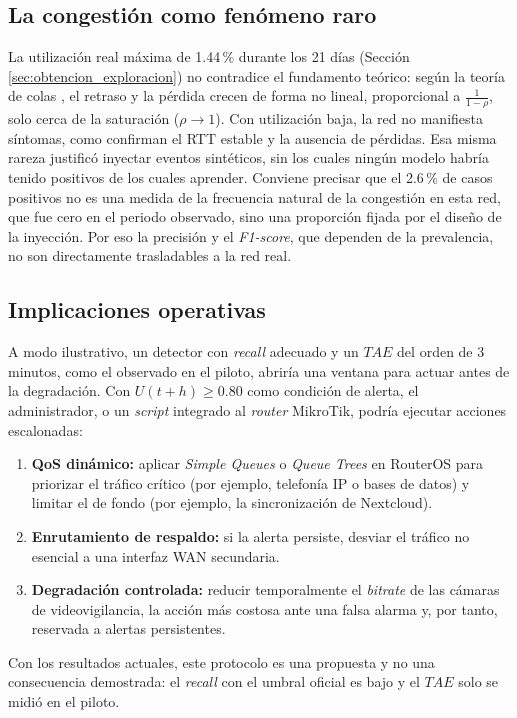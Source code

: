 \documentclass[12pt]{report}
\begin{document}
\subsection*{La congestión como fenómeno raro}

La utilización real máxima de 1.44\,\% durante los 21 días (Sección \ref{sec:obtencion_exploracion}) no contradice el fundamento teórico: según la teoría de colas \cite{kleinrock1976}, el retraso y la pérdida crecen de forma no lineal, proporcional a $\frac{1}{1-\rho}$, solo cerca de la saturación ($\rho \to 1$). Con utilización baja, la red no manifiesta síntomas, como confirman el RTT estable y la ausencia de pérdidas. Esa misma rareza justificó inyectar eventos sintéticos, sin los cuales ningún modelo habría tenido positivos de los cuales aprender. Conviene precisar que el 2.6\,\% de casos positivos no es una medida de la frecuencia natural de la congestión en esta red, que fue cero en el periodo observado, sino una proporción fijada por el diseño de la inyección. Por eso la precisión y el \textit{F1-score}, que dependen de la prevalencia, no son directamente trasladables a la red real.

\subsection*{Implicaciones operativas}

A modo ilustrativo, un detector con \textit{recall} adecuado y un $TAE$ del orden de 3 minutos, como el observado en el piloto, abriría una ventana para actuar antes de la degradación. Con $U(t+h) \geq 0.80$ como condición de alerta, el administrador, o un \textit{script} integrado al \textit{router} MikroTik, podría ejecutar acciones escalonadas:
\begin{enumerate}
    \item \textbf{QoS dinámico:} aplicar \textit{Simple Queues} o \textit{Queue Trees} en RouterOS para priorizar el tráfico crítico (por ejemplo, telefonía IP o bases de datos) y limitar el de fondo (por ejemplo, la sincronización de Nextcloud).
    \item \textbf{Enrutamiento de respaldo:} si la alerta persiste, desviar el tráfico no esencial a una interfaz WAN secundaria.
    \item \textbf{Degradación controlada:} reducir temporalmente el \textit{bitrate} de las cámaras de videovigilancia, la acción más costosa ante una falsa alarma y, por tanto, reservada a alertas persistentes.
\end{enumerate}
Con los resultados actuales, este protocolo es una propuesta y no una consecuencia demostrada: el \textit{recall} con el umbral oficial es bajo y el $TAE$ solo se midió en el piloto.
\end{document}
